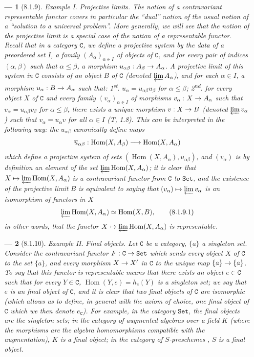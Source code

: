 \documentclass[oneside]{amsart}
\theoremstyle{ega-env-style}
\newtheorem*{env}{---}
\theoremstyle{ega-thm-env-style}
\theoremstyle{ega-defn-env-style}
\def\cat{\mathtt}                   %
\def\leq{\leqslant}                 %
\def\C{\cat{C}}                     %
\def\Set{\cat{Set}}                 %
\def\Hom{\operatorname{Hom}}
\renewcommand{\to}{\mathchoice{\longrightarrow}{\rightarrow}{\rightarrow}{\rightarrow}}
\let\mapstoo\mapsto
\renewcommand{\mapsto}{\mathchoice{\longmapsto}{\mapstoo}{\mapstoo}{\mapstoo}}
\def\isoto{\simeq} %
\newcommand{\oldpage}[2][]{{\marginnote{\normalfont{\textbf{#1}~|~#2}}}\ignorespaces}
\let\EGAOriginalLabel\label
\renewcommand{\label}[1]{\phantomsection\EGAOriginalLabel{#1}}
\begin{document}
\begin{env}[8.1.9]
\label{0.8.1.9}
\textit{Example I. Projective limits}.
The notion of a contravariant representable functor covers in particular the ``dual'' notion of the usual notion of a ``solution to a universal problem''.
\oldpage[0\textsubscript{III}]{8}
More generally, we will see that the notion of the \emph{projective limit} is a special case of the notion of a representable functor.
Recall that in a category $\C$, we define a \emph{projective system} by the data of a preordered set $I$, a family $(A_\alpha)_{\alpha\in I}$ of objects of $\C$, and for every pair of indices $(\alpha,\beta)$ such that $\alpha\leq\beta$, a morphism $u_{\alpha\beta}:A_\beta\to A_\alpha$.
A \emph{projective limit} of this system in $\C$ consists of an object $B$ of $\C$ (denoted $\varprojlim A_\alpha$), and for each $\alpha\in I$, a morphism $u_\alpha:B\to A_\alpha$ such that: 1\textsuperscript{st}. $u_\alpha=u_{\alpha\beta}u_\beta$ for $\alpha\leq\beta$; 2\textsuperscript{nd}. for every object $X$ of $\C$ and every family $(v_\alpha)_{\alpha\in I}$ of morphisms $v_\alpha:X\to A_\alpha$ such that $v_\alpha=u_{\alpha\beta}v_\beta$ for $\alpha\leq\beta$, there exists a unique morphism $v:X\to B$ (denoted $\varprojlim v_\alpha$) such that $v_\alpha=u_\alpha v$ for all $\alpha\in I$ (T, 1.8).
This can be interpreted in the following way: the $u_{\alpha\beta}$ canonically define maps
\[
  \overline{u}_{\alpha\beta}:\Hom(X,A_\beta)\to\Hom(X,A_\alpha)
\]
which define a \emph{projective system} of sets $(\Hom(X,A_\alpha),\overline{u}_{\alpha\beta})$, and $(v_\alpha)$ is by definition an element of the set $\varprojlim\Hom(X,A_\alpha)$; it is clear that $X\mapsto\varprojlim\Hom(X,A_\alpha)$ is a \emph{contravariant functor} from $\C$ to $\Set$, and the existence of the projective limit $B$ is equivalent to saying that $(v_\alpha)\mapsto\varprojlim v_\alpha$ is an \emph{isomorphism} of functors in $X$
\[
  \varprojlim\Hom(X,A_\alpha)\isoto\Hom(X,B),
  \tag{8.1.9.1}
\]
in other words, that the functor $X\mapsto\varprojlim\Hom(X,A_\alpha)$ is \emph{representable}.
\end{env}

\begin{env}[8.1.10]
\label{0.8.1.10}
\textit{Example II. Final objects}.
Let $\C$ be a category, $\{a\}$ a singleton set.
Consider the contravariant functor $F:\C\to\Set$ which sends every object $X$ of $\C$ to the set $\{a\}$, and every morphism $X\to X'$ in $\C$ to the unique map $\{a\}\to\{a\}$.
To say that this functor is \emph{representable} means that there exists an object $e\in\C$ such that for every $Y\in\C$, $\Hom(Y,e)=h_e(Y)$ is a \emph{singleton set}; we say that $e$ is an \emph{final object} of $\C$, and it is clear that two final objects of $\C$ are isomorphic (which allows us to define, in general with the axiom of choice, \emph{one} final object of $\C$ which we then denote $e_\C$).
For example, in the category $\Set$, the final objects are the singleton sets; in the category of \emph{augmented algebras} over a field $K$ (where the morphisms are the algebra homomorphisms compatible with the augmentation), $K$ is a final object; in the category of \emph{$S$-preschemes} , $S$ is a final object.
\end{env}
\end{document}
